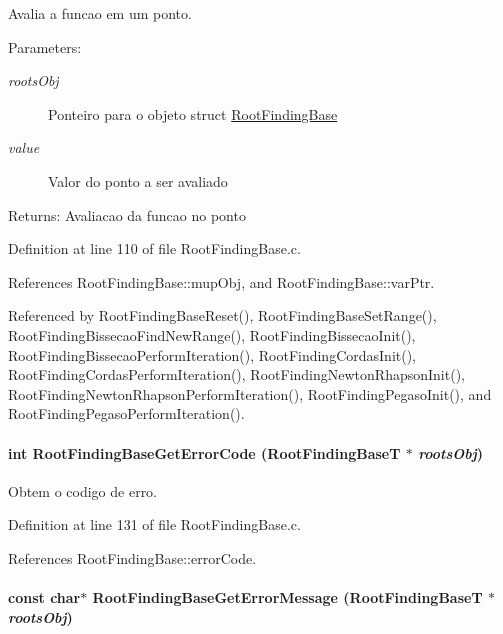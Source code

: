 Avalia a funcao em um ponto. 

\begin{Desc}
\item[Parameters:]
\begin{description}
\item[{\em rootsObj}]Ponteiro para o objeto struct \hyperlink{structRootFindingBase}{RootFindingBase} \item[{\em value}]Valor do ponto a ser avaliado \end{description}
\end{Desc}
\begin{Desc}
\item[Returns:]Avaliacao da funcao no ponto \end{Desc}


Definition at line 110 of file RootFindingBase.c.

References RootFindingBase::mupObj, and RootFindingBase::varPtr.

Referenced by RootFindingBaseReset(), RootFindingBaseSetRange(), RootFindingBissecaoFindNewRange(), RootFindingBissecaoInit(), RootFindingBissecaoPerformIteration(), RootFindingCordasInit(), RootFindingCordasPerformIteration(), RootFindingNewtonRhapsonInit(), RootFindingNewtonRhapsonPerformIteration(), RootFindingPegasoInit(), and RootFindingPegasoPerformIteration().\hypertarget{group____roots_gbcf354e731e02c63652af3a2058e739d}{
\paragraph[RootFindingBaseGetErrorCode]{\setlength{\rightskip}{0pt plus 5cm}int RootFindingBaseGetErrorCode ({\bf RootFindingBaseT} $\ast$ {\em rootsObj})}\hfill}
\label{group____roots_gbcf354e731e02c63652af3a2058e739d}


Obtem o codigo de erro. 



Definition at line 131 of file RootFindingBase.c.

References RootFindingBase::errorCode.\hypertarget{group____roots_gcc5a0a8948e4b02a878f8d534c0bc982}{
\paragraph[RootFindingBaseGetErrorMessage]{\setlength{\rightskip}{0pt plus 5cm}const char$\ast$ RootFindingBaseGetErrorMessage ({\bf RootFindingBaseT} $\ast$ {\em rootsObj})}\hfill}
\label{group____roots_gcc5a0a8948e4b02a878f8d534c0bc982}


